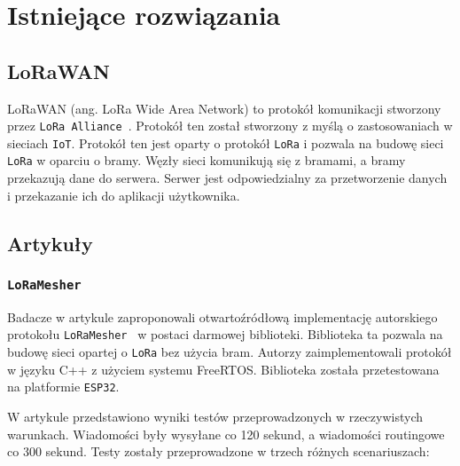 \chapter{Istniejące rozwiązania}

\section{LoRaWAN}
LoRaWAN (ang. LoRa Wide Area Network) to protokół komunikacji stworzony przez \texttt{LoRa Alliance}~\cite{lora:about}. Protokół ten został stworzony z myślą o zastosowaniach w sieciach \texttt{IoT}. Protokół ten jest oparty o protokół \texttt{LoRa} i pozwala na budowę sieci \texttt{LoRa} w oparciu o bramy. Węzły sieci komunikują się z bramami, a bramy przekazują dane do serwera. Serwer jest odpowiedzialny za przetworzenie danych i przekazanie ich do aplikacji użytkownika.




\section{Artykuły}
\subsection{\texttt{LoRaMesher}}
Badacze w artykule zaproponowali otwartoźródłową implementację autorskiego protokołu \texttt{LoRaMesher}~\cite{bib:loramesher} w postaci darmowej biblioteki. Biblioteka ta pozwala na budowę sieci opartej o \texttt{LoRa} bez użycia bram. Autorzy zaimplementowali protokół w języku C++ z użyciem systemu FreeRTOS. Biblioteka została przetestowana na platformie \texttt{ESP32}.

W artykule przedstawiono wyniki testów przeprowadzonych w rzeczywistych warunkach. Wiadomości były wysyłane co 120 sekund, a wiadomości routingowe co 300 sekund. Testy zostały przeprowadzone w trzech różnych scenariuszach:

